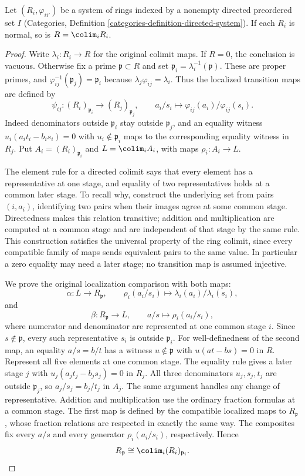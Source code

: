 \begin{lemma}
\label{lemma-colimit-normal-ring}
Let $(R_i,\varphi_{ii'})$ be a system of rings indexed by a nonempty
directed preordered set $I$
(Categories, Definition \ref{categories-definition-directed-system}).
If each $R_i$ is normal, so is
$R = \colim_i R_i$.
\end{lemma}

\begin{proof}
Write $\lambda_i:R_i\to R$ for the original colimit maps.
If $R=0$, the conclusion is vacuous. Otherwise fix a prime
$\mathfrak p\subset R$ and set
$\mathfrak p_i=\lambda_i^{-1}(\mathfrak p)$.
These are proper primes, and
$\varphi_{ij}^{-1}(\mathfrak p_j)=\mathfrak p_i$ because
$\lambda_j\varphi_{ij}=\lambda_i$.
Thus the localized transition maps are defined by
$$
\psi_{ij}:(R_i)_{\mathfrak p_i}\longrightarrow(R_j)_{\mathfrak p_j},
\qquad a_i/s_i\longmapsto
\varphi_{ij}(a_i)/\varphi_{ij}(s_i).
$$
Indeed denominators outside $\mathfrak p_i$ stay outside
$\mathfrak p_j$, and an equality witness
$u_i(a_it_i-b_is_i)=0$ with $u_i\notin\mathfrak p_i$
maps to the corresponding equality witness in $R_j$.
Put $A_i=(R_i)_{\mathfrak p_i}$ and $L=\colim_i A_i$,
with maps $\rho_i:A_i\to L$.

The element rule for a directed colimit says that every element
has a representative at one stage, and equality of two representatives
holds at a common later stage. To recall why, construct the underlying
set from pairs $(i,a_i)$, identifying two pairs when their images
agree at some common stage. Directedness makes this relation
transitive; addition and multiplication are computed at a common
stage and are independent of that stage by the same rule.
This construction satisfies the universal property of the ring
colimit, since every compatible family of maps sends equivalent
pairs to the same value. In particular a zero equality may need
a later stage; no transition map is assumed injective.

We prove the original localization comparison with both maps:
$$
\alpha:L\longrightarrow R_{\mathfrak p},\qquad
\rho_i(a_i/s_i)\longmapsto
\lambda_i(a_i)/\lambda_i(s_i),
$$
and
$$
\beta:R_{\mathfrak p}\longrightarrow L,\qquad
a/s\longmapsto\rho_i(a_i/s_i),
$$
where numerator and denominator are represented at one common
stage $i$. Since $s\notin\mathfrak p$, every such representative
$s_i$ is outside $\mathfrak p_i$. For well-definedness of the
second map, an equality $a/s=b/t$ has a witness
$u\notin\mathfrak p$ with $u(at-bs)=0$ in $R$.
Represent all five elements at one common stage. The equality
rule gives a later stage $j$ with
$u_j(a_jt_j-b_js_j)=0$ in $R_j$.
All three denominators $u_j,s_j,t_j$ are outside
$\mathfrak p_j$, so $a_j/s_j=b_j/t_j$ in $A_j$.
The same argument handles any change of representative.
Addition and multiplication use the ordinary fraction formulas
at a common stage. The first map is defined by the compatible
localized maps to $R_{\mathfrak p}$, whose fraction relations
are respected in exactly the same way.
The composites fix every $a/s$ and every generator
$\rho_i(a_i/s_i)$, respectively. Hence
$$
R_{\mathfrak p}\cong\colim_i(R_i)_{\mathfrak p_i}.
$$


\end{proof}
